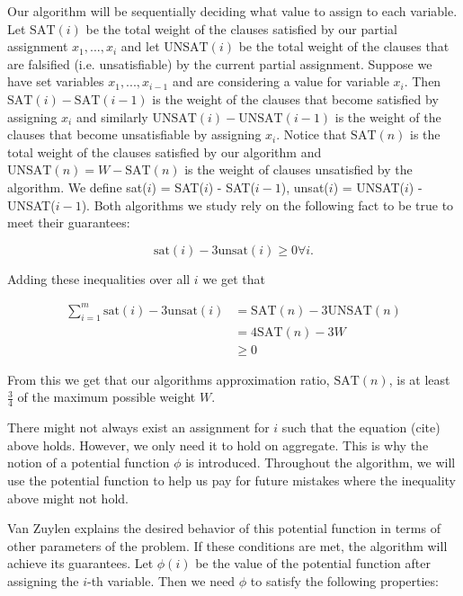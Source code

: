 \documentclass[11pt,letter]{article}
\numberwithin{theorem}{section}
\begin{document}
Our algorithm will be sequentially deciding what value to assign to each variable. Let $\mathrm{SAT}(i)$ be the total weight of the clauses
satisfied by our partial assignment $x_1, ..., x_i$ and let $\mathrm{UNSAT}(i)$ be the total weight of the clauses that are falsified (i.e. unsatisfiable) by the current partial assignment.
Suppose we have set variables $x_1,...,x_{i-1}$ and are considering a value for variable $x_i$. Then $\mathrm{SAT}(i)-\mathrm{SAT}(i-1)$ is the weight
of the clauses that become satisfied by assigning $x_i$ and similarly $\mathrm{UNSAT}(i) - \mathrm{UNSAT}(i-1)$ is the weight of the clauses that become
unsatisfiable by assigning $x_i$.
Notice that $\mathrm{SAT}(n)$ is the total weight of the clauses satisfied by our algorithm and $\mathrm{UNSAT}(n) = W - \mathrm{SAT}(n)$ is the weight of clauses
unsatisfied by the algorithm. We define sat($i$) = SAT($i$) - SAT($i-1$), unsat($i$) = UNSAT($i$) - UNSAT($i-1$). Both algorithms we study rely on the following fact to be true to meet their guarantees:

\begin{equation}
\label{eq:1}
\mathrm{sat}(i) - 3\mathrm{unsat}(i) \geq 0 \forall i.
\end{equation}

Adding these inequalities over all $i$ we get that

\begin{equation*}
\begin{aligned}
\sum_{i = 1}^{m} \mathrm{sat}(i) - 3\mathrm{unsat}(i) & = \mathrm{SAT}(n) - 3\mathrm{UNSAT}(n) \\
& = 4\mathrm{SAT}(n) - 3W \\
& \geq 0
\end{aligned}
\end{equation*}

From this we get that our algorithms approximation ratio, $\textrm{SAT}(n)$, is at least $\frac{3}{4}$ of the maximum possible weight $W$.

There might not always exist an assignment for $i$ such that the equation (cite) above holds. However, we only need it to hold on aggregate.
This is why the notion of a potential function $\phi$ is introduced. Throughout the algorithm, we will use the potential function to help us pay
for future mistakes where the inequality above might not hold.

Van Zuylen explains the desired behavior of this potential function in terms of other parameters of the problem. If these conditions are met, the algorithm
will achieve its guarantees. Let $\phi(i)$ be the value of the potential function after assigning the $i$-th variable. Then we need $\phi$ to satisfy the following properties:
\end{document}
